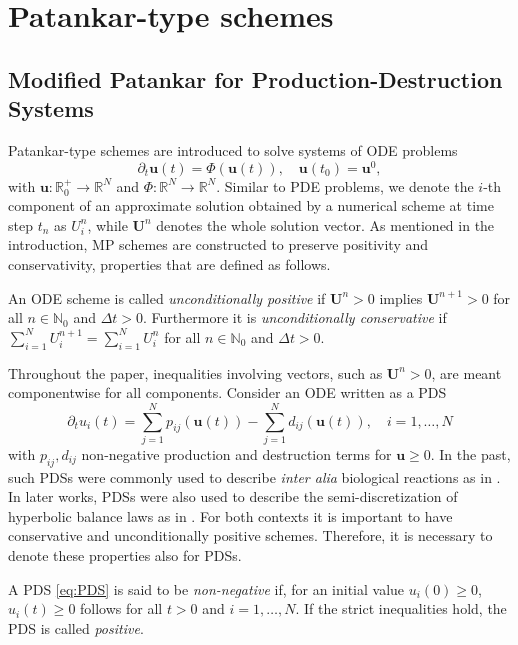 \documentclass[final,11pt, times, linenumber, nopreprintline]{elsarticle}
\newcommand{\N}{\mathbb{N}}
\newcommand{\R}{\mathbb{R}}
\newcommand{\bU}{\bm U}
\begin{document}
\section{Patankar-type schemes}\label{se_Patankar}
\subsection{Modified Patankar  for Production-Destruction Systems}
Patankar-type schemes are introduced to solve systems of ODE problems
\begin{equation}
	 \partial_t\mathbf{u}(t) = \Phi(\mathbf{u}(t)), \quad \mathbf{u}(t_0) = \mathbf{u}^0,
\end{equation}
with $\mathbf{u}: \R_0^+ \rightarrow \R^N$ and $\Phi: \R^N \rightarrow \R^N$.
Similar to PDE problems, we denote the $i$-th component of an approximate solution obtained by a numerical scheme at time step $t_n$ as $U^n_i$, while $\bU^n$ denotes the whole solution vector.
As mentioned in the introduction, MP schemes are constructed to preserve positivity and conservativity, properties that are defined as follows.
\begin{dfn}
	An ODE scheme is called \textit{unconditionally positive} if $\bU^n>0$ implies $\bU^{n+1}>0$ for all $n\in\N_0$ and $\Delta t > 0$. Furthermore it is \textit{unconditionally conservative} if $\sum_{i=1}^{N} U_i^{n+1}=\sum_{i=1}^{N} U_i^n $ for all $n \in \N_0$ and $\Delta t > 0$.
\end{dfn}
Throughout the paper, inequalities involving vectors, such as $\bU^n>0$, are meant componentwise for all components.
Consider an ODE written as a PDS
\begin{equation}
\partial_t u_i(t)=\sum_{j=1}^N p_{ij}(\mathbf u(t))-\sum_{j=1}^N d_{ij}(\mathbf u(t)), \quad i=1,\ldots,N 
\label{eq:PDS}
\end{equation}
with $p_{ij},d_{ij}$ non-negative production and destruction terms for $\mathbf{u}\geq 0$. In the past, such PDSs were commonly used to describe \textit{inter alia} biological reactions as in \cite{burchard_high-order_2003}. In later works, PDSs were also used to describe the semi-discretization of hyperbolic balance laws as in \cite{offner2020arbitrary, MO2014}. For both contexts it is important to have conservative and unconditionally positive schemes. Therefore, it is necessary to denote these properties also for PDSs.
\begin{dfn}
	A PDS \eqref{eq:PDS} is said to be \textit{non-negative} if, for an initial value $u_i(0)\geq 0$, $u_i(t)\geq 0$ follows for all $t > 0$ and $i = 1, \dots, N$. If the strict inequalities hold, the PDS is called \textit{positive}.
	\end{dfn}
\end{document}
